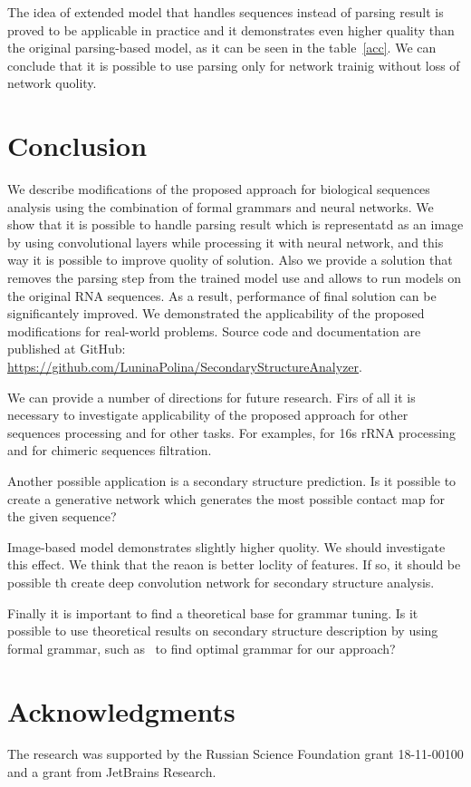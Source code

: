 \documentclass[12pt,a4paper]{cibb}
\begin{document}
The idea of extended model that handles sequences instead of parsing result is proved to be applicable in practice and it demonstrates even higher quality than the original parsing-based model, as it can be seen in the table~\ref{acc}.
We can conclude that it is possible to use parsing only for network trainig without loss of network quolity.

\section{\bf Conclusion}

We describe modifications of the proposed approach for biological sequences analysis using the combination of formal grammars and neural networks.
We show that it is possible to handle parsing result which is representatd as an image by using convolutional layers while processing it with neural network, and this way it is possible to improve quolity of solution.
Also we provide a solution that removes the parsing step from the trained model use and allows to run models on the original RNA sequences.
As a result, performance of final solution can be significantely improved.
We demonstrated the applicability of the proposed modifications for real-world problems.
Source code and documentation are published at GitHub: \url{https://github.com/LuninaPolina/SecondaryStructureAnalyzer}.

We can provide a number of directions for future research.
Firs of all it is necessary to investigate applicability of the proposed approach for other sequences processing and for other tasks.
For examples, for 16s rRNA processing and for chimeric sequences filtration.

Another possible application is a secondary structure prediction.
Is it possible to create a generative network which generates the most possible contact map for the given sequence?

Image-based model demonstrates slightly higher quolity.
We should investigate this effect.
We think that the reaon is better loclity of features.
If so, it should be possible th create deep convolution network for secondary structure analysis.

Finally it is important to find a theoretical base for grammar tuning. Is it possible to use theoretical results on secondary structure description by using formal grammar, such as~\cite{MQ!!!} to find optimal grammar for our approach?

\section*{\bf Acknowledgments}

The research was supported by the Russian Science Foundation grant 18-11-00100 and a grant from JetBrains Research.



%


{\fontsize{10}{10}\selectfont
\setlength{\parskip}{0pt}



}
\end{document}
